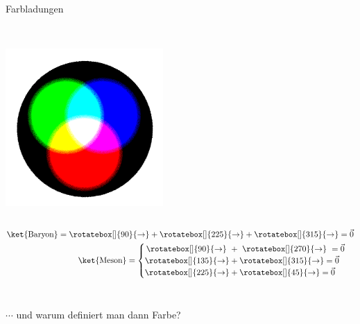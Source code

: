 \begin{frame}{Farbladungen}
    \begin{column}{.58\textwidth}
\\ \includegraphics[width=6cm]{Figures Introductory Lecture/Standard Model/BlackAdditiveColours.png}
\end{column}%
\begin{column}{.42\textwidth}

\begin{align*}
    \ket{\textmd{Baryon}}=\rotatebox[]{90}{\rightarrow}+\rotatebox[]{225}{\rightarrow}+\rotatebox[]{315}{\rightarrow}=\Vec{0}\\ 
    \ket{\textmd{Meson}}=
    \begin{cases} \,\rotatebox[]{90}{\rightarrow}~+~\rotatebox[]{270}{\rightarrow}~=\Vec{0}\\
    \rotatebox[]{135}{\rightarrow}+\rotatebox[]{315}{\rightarrow}=\Vec{0}\\
    \rotatebox[]{225}{\rightarrow}+\rotatebox[]{45}{\rightarrow}=\Vec{0}
    \end{cases} 
\end{align*} \pause
 \\ \pause

 $\cdots$ und warum definiert man dann Farbe?
 \end{column}
 \end{frame}

